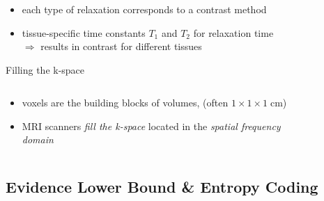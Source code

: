 \documentclass[
	11pt, %
	aspectratio=169, %
]{beamer}
\begin{document}
 \begin{frame}
	\frametitle{}
	\framesubtitle{}
	\begin{itemize}
		\item each type of relaxation corresponds to a contrast method
		\item tissue-specific time constants  $T_1$ and $T_2$ for relaxation time\\
			\vspace{1em}
		$\Longrightarrow$ results in contrast for different tissues
        	\begin{figure}
        	    \centering
        	\end{figure}
	\end{itemize}
\end{frame}

\begin{frame}{Filling the k-space}
	\vspace{-1.5em}
\begin{columns}[c] %
		\begin{column}{0.45\textwidth} %
		\begin{itemize}
			\item voxels are the building blocks of volumes, (often $1\times 1 \times 1 \;$cm)
			\item MRI scanners \textit{fill the k-space} located in the \textit{spatial frequency domain}
			\end{itemize}
		\end{column}
		\begin{column}{0.55\textwidth} %
        	\begin{figure}
        	    \centering
        	\end{figure}
		\end{column}
	\end{columns}
\end{frame}



\subsection{Evidence Lower Bound \& Entropy Coding}
\end{document}
